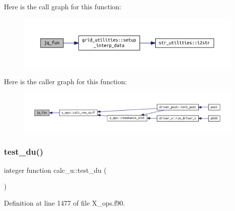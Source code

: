Here is the call graph for this function\+:
\nopagebreak
\begin{figure}[H]
\begin{center}
\leavevmode
\includegraphics[width=350pt]{X__ops_8f90_afba7acbd6df586741b0375f1d699574f_cgraph}
\end{center}
\end{figure}
Here is the caller graph for this function\+:
\nopagebreak
\begin{figure}[H]
\begin{center}
\leavevmode
\includegraphics[width=350pt]{X__ops_8f90_afba7acbd6df586741b0375f1d699574f_icgraph}
\end{center}
\end{figure}
\mbox{\label{X__ops_8f90_a60ad682c469a085ff3f744ce3191940f}} 
\subsubsection{\texorpdfstring{test\+\_\+du()}{test\_du()}}
{\footnotesize\ttfamily integer function calc\+\_\+u\+::test\+\_\+du (\begin{DoxyParamCaption}{ }\end{DoxyParamCaption})}



Definition at line 1477 of file X\+\_\+ops.\+f90.

